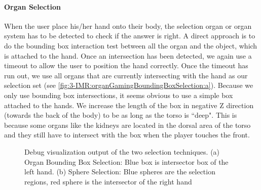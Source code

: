 \paragraph{Organ Selection}
When the user place his/her hand onto their body, the selection organ or organ system has to be detected to check if the answer is right. 
A direct approach is to do the bounding box interaction test between all the organ and the object, which is attached to the hand. 
Once an intersection has been detected, we again use a timeout to allow the user to position the hand correctly. Once the timeout has run out, we use all organs that are currently intersecting with the hand as our selection set (see \figurename{\ref{fig:3-IMR:organGamingBoundingBoxSelection:a}}).
Because we only use bounding box intersections, it seems obvious to use a simple box attached to the hands. We increase the length of the box in negative Z direction (towards the back of the body) to be as long as the torso is ``deep". This is because some organs like the kidneys are located in the dorsal area of the torso and they still have to intersect with the box when the player touches the front.

\begin{figure}[htb]
	\centering
	\caption{Debug visualization output of the two selection techniques. (a) Organ Bounding Box Selection: Blue box is intersector box of the left hand. (b) Sphere Selection: Blue spheres are the selection regions, red sphere is the intersector of the right hand}
	\label{fig:3-IMR:organGamingBoundingBoxSelection}
\end{figure}
